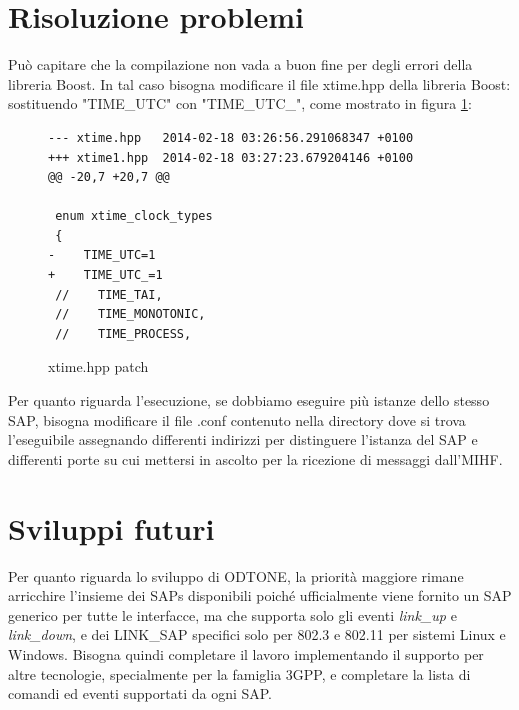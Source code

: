 \section{Risoluzione problemi}
Può capitare che la compilazione non vada a buon fine per degli errori della libreria Boost. In tal caso bisogna modificare il file xtime.hpp della libreria Boost:\\
sostituendo "TIME\_UTC" con "TIME\_UTC\_", come mostrato in figura \ref{fig:patch}:\\

\begin{figure}
\begin{verbatim}
--- xtime.hpp   2014-02-18 03:26:56.291068347 +0100
+++ xtime1.hpp  2014-02-18 03:27:23.679204146 +0100
@@ -20,7 +20,7 @@

 enum xtime_clock_types
 {
-    TIME_UTC=1
+    TIME_UTC_=1
 //    TIME_TAI,
 //    TIME_MONOTONIC,
 //    TIME_PROCESS,
\end{verbatim}
\caption{xtime.hpp patch}
\label{fig:patch}
\end{figure}
Per quanto riguarda l'esecuzione, se dobbiamo eseguire più istanze dello stesso SAP, bisogna modificare il file .conf contenuto nella directory dove si trova l'eseguibile assegnando differenti indirizzi per distinguere l'istanza del SAP e differenti porte su cui mettersi in ascolto per la ricezione di messaggi dall'MIHF.

\section{Sviluppi futuri}
Per quanto riguarda lo sviluppo di ODTONE, la priorità maggiore rimane arricchire l'insieme dei SAPs disponibili poiché ufficialmente viene fornito un SAP generico per tutte le interfacce, ma che supporta solo gli eventi {\em link\_up} e {\em link\_down}, e dei LINK\_SAP specifici solo per 802.3 e 802.11 per sistemi Linux e Windows. Bisogna quindi completare il lavoro implementando il supporto per altre tecnologie, specialmente per la famiglia 3GPP, e completare la lista di comandi ed eventi supportati da ogni SAP.